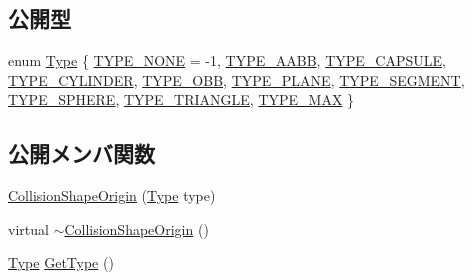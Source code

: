 \subsection*{公開型}
\begin{DoxyCompactItemize}
\item 
enum \mbox{\hyperlink{class_collision_shape_origin_a67e36d4922d9723caed9c21b1df80f0b}{Type}} \{ \newline
\mbox{\hyperlink{class_collision_shape_origin_a67e36d4922d9723caed9c21b1df80f0baacfe3f00c0769f6e65288b4bb7b65f6a}{T\+Y\+P\+E\+\_\+\+N\+O\+NE}} = -\/1, 
\mbox{\hyperlink{class_collision_shape_origin_a67e36d4922d9723caed9c21b1df80f0ba3f49ffec8bb5c191ca0e131f4a0aa679}{T\+Y\+P\+E\+\_\+\+A\+A\+BB}}, 
\mbox{\hyperlink{class_collision_shape_origin_a67e36d4922d9723caed9c21b1df80f0ba4da47de9ef77cdc7ce8d33568c08a6a0}{T\+Y\+P\+E\+\_\+\+C\+A\+P\+S\+U\+LE}}, 
\mbox{\hyperlink{class_collision_shape_origin_a67e36d4922d9723caed9c21b1df80f0bad42c81c0a2cfce67bc03455c36c67709}{T\+Y\+P\+E\+\_\+\+C\+Y\+L\+I\+N\+D\+ER}}, 
\newline
\mbox{\hyperlink{class_collision_shape_origin_a67e36d4922d9723caed9c21b1df80f0ba01bfd26532e547b6382f5ef6943ae45d}{T\+Y\+P\+E\+\_\+\+O\+BB}}, 
\mbox{\hyperlink{class_collision_shape_origin_a67e36d4922d9723caed9c21b1df80f0ba4d134d746d386e176463d0fafdd7bfdc}{T\+Y\+P\+E\+\_\+\+P\+L\+A\+NE}}, 
\mbox{\hyperlink{class_collision_shape_origin_a67e36d4922d9723caed9c21b1df80f0ba99afbcd21cc1814358a291b23705aa4f}{T\+Y\+P\+E\+\_\+\+S\+E\+G\+M\+E\+NT}}, 
\mbox{\hyperlink{class_collision_shape_origin_a67e36d4922d9723caed9c21b1df80f0ba664d6f18060c3813b3e463c9c6c1bf15}{T\+Y\+P\+E\+\_\+\+S\+P\+H\+E\+RE}}, 
\newline
\mbox{\hyperlink{class_collision_shape_origin_a67e36d4922d9723caed9c21b1df80f0ba564325798c6f7ea5bb71e82d3a68bff2}{T\+Y\+P\+E\+\_\+\+T\+R\+I\+A\+N\+G\+LE}}, 
\mbox{\hyperlink{class_collision_shape_origin_a67e36d4922d9723caed9c21b1df80f0baed0e79796dc9a073682d727c1d046cfc}{T\+Y\+P\+E\+\_\+\+M\+AX}}
 \}
\end{DoxyCompactItemize}
\subsection*{公開メンバ関数}
\begin{DoxyCompactItemize}
\item 
\mbox{\hyperlink{class_collision_shape_origin_a185eecc964a8372f373937c22fa22b82}{Collision\+Shape\+Origin}} (\mbox{\hyperlink{class_collision_shape_origin_a67e36d4922d9723caed9c21b1df80f0b}{Type}} type)
\item 
virtual \mbox{\hyperlink{class_collision_shape_origin_a0b5b171795d247ba27ee8a0399446f68}{$\sim$\+Collision\+Shape\+Origin}} ()
\item 
\mbox{\hyperlink{class_collision_shape_origin_a67e36d4922d9723caed9c21b1df80f0b}{Type}} \mbox{\hyperlink{class_collision_shape_origin_aad36bc52116291d14c9d4797f115e60d}{Get\+Type}} ()
\end{DoxyCompactItemize}


